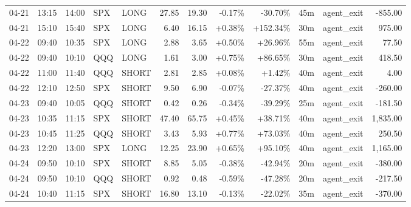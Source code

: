 \documentclass[11pt,a4paper,twoside]{article}
\begin{document}
\begin{center}
\begin{longtable}{>{\color{txtmain}}l l l l l r r r r r >{\color{txtmain}}l r}
04-21 & 13:15 & 14:00 & SPX & LONG & 27.85 & 19.30 & \textcolor{lossred}{-0.17\%} & \textcolor{lossred}{-30.70\%} & 45m & agent\_exit & \textcolor{lossred}{-855.00} \\
04-21 & 15:10 & 15:40 & SPX & LONG & 6.40 & 16.15 & \textcolor{wingreen}{+0.38\%} & \textcolor{wingreen}{+152.34\%} & 30m & agent\_exit & \textcolor{wingreen}{975.00} \\
04-22 & 09:40 & 10:35 & SPX & LONG & 2.88 & 3.65 & \textcolor{wingreen}{+0.50\%} & \textcolor{wingreen}{+26.96\%} & 55m & agent\_exit & \textcolor{wingreen}{77.50} \\
04-22 & 09:40 & 10:10 & QQQ & LONG & 1.61 & 3.00 & \textcolor{wingreen}{+0.75\%} & \textcolor{wingreen}{+86.65\%} & 30m & agent\_exit & \textcolor{wingreen}{418.50} \\
04-22 & 11:00 & 11:40 & QQQ & SHORT & 2.81 & 2.85 & \textcolor{wingreen}{+0.08\%} & \textcolor{wingreen}{+1.42\%} & 40m & agent\_exit & \textcolor{wingreen}{4.00} \\
04-22 & 12:10 & 12:50 & SPX & SHORT & 9.50 & 6.90 & \textcolor{lossred}{-0.07\%} & \textcolor{lossred}{-27.37\%} & 40m & agent\_exit & \textcolor{lossred}{-260.00} \\
04-23 & 09:40 & 10:05 & QQQ & SHORT & 0.42 & 0.26 & \textcolor{lossred}{-0.34\%} & \textcolor{lossred}{-39.29\%} & 25m & agent\_exit & \textcolor{lossred}{-181.50} \\
04-23 & 10:35 & 11:15 & SPX & SHORT & 47.40 & 65.75 & \textcolor{wingreen}{+0.45\%} & \textcolor{wingreen}{+38.71\%} & 40m & agent\_exit & \textcolor{wingreen}{1,835.00} \\
04-23 & 10:45 & 11:25 & QQQ & SHORT & 3.43 & 5.93 & \textcolor{wingreen}{+0.77\%} & \textcolor{wingreen}{+73.03\%} & 40m & agent\_exit & \textcolor{wingreen}{250.50} \\
04-23 & 12:20 & 13:00 & SPX & LONG & 12.25 & 23.90 & \textcolor{wingreen}{+0.65\%} & \textcolor{wingreen}{+95.10\%} & 40m & agent\_exit & \textcolor{wingreen}{1,165.00} \\
04-24 & 09:50 & 10:10 & SPX & SHORT & 8.85 & 5.05 & \textcolor{lossred}{-0.38\%} & \textcolor{lossred}{-42.94\%} & 20m & agent\_exit & \textcolor{lossred}{-380.00} \\
04-24 & 09:50 & 10:10 & QQQ & SHORT & 0.92 & 0.48 & \textcolor{lossred}{-0.59\%} & \textcolor{lossred}{-47.28\%} & 20m & agent\_exit & \textcolor{lossred}{-217.50} \\
04-24 & 10:40 & 11:15 & SPX & SHORT & 16.80 & 13.10 & \textcolor{lossred}{-0.13\%} & \textcolor{lossred}{-22.02\%} & 35m & agent\_exit & \textcolor{lossred}{-370.00} \\

\end{longtable}
\end{center}
\end{document}

